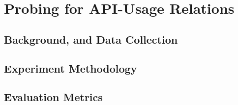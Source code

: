 \section{Probing \tool for API-Usage Relations}
\label{sec:eval}

\subsection{Background, and Data Collection}

\subsection{Experiment Methodology}

\subsection{Evaluation Metrics}


